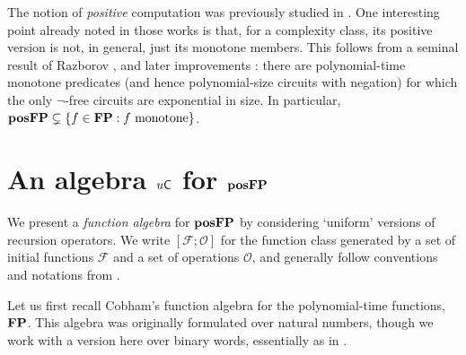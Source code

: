 \documentclass{lmcs}
\begin{document}
\begin{remark}
	The notion of \emph{positive} computation was previously studied in \cite{Grigni:1992:MC:167687.167706,LautemannSS96:on-pos-p,LSS98}.
	One interesting point already noted in those works is that, for a complexity class, its positive version is not, in general, just its monotone members.
	This follows from a seminal result of Razborov \cite{Razborov85}, and later improvements \cite{alon1987monotone,tardos1988gap}: there are polynomial-time monotone predicates (and hence polynomial-size circuits with negation) for which the only $\neg$-free circuits are exponential in size. In particular, $\mathbf{pos}\mathbf{FP} \subsetneq \{ f \in \mathbf{FP}: f \text{ monotone} \}$.
\end{remark}



\section{An algebra $u \mathsf{C}$ for $\mathbf{pos}\mathbf{FP}$} 
\label{sect:unicob}

We present a \emph{function algebra} for $\mathbf{pos}\mathbf{FP}$ by considering `uniform' versions of recursion operators.
%
We write $[\mathcal F ; \mathcal O]$ for the function class generated by a set of initial functions $\mathcal F$ and a set of operations $\mathcal O$, and generally follow conventions and notations from \cite{CloKra02}.

Let us first recall Cobham's function algebra for the polynomial-time functions,~$\mathbf{FP}$.
This algebra was originally formulated over natural numbers, though we work with a version here over binary words, essentially as in \cite{FF,IO97}.
%
\end{document}
